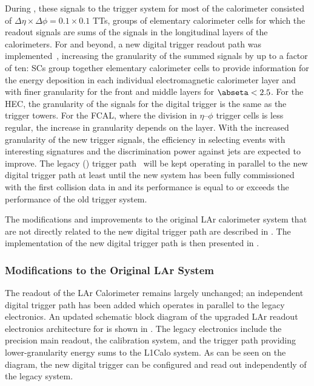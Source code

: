 \documentclass[cernpreprint, atlasdraft=false, UKenglish,british,orcidlogo, texmf, orcidlogo]{atlasdoc}
\begin{document}
During \RunOneTwo, these
signals to the trigger system for most of the calorimeter
consisted of    $\Delta\eta\times\Delta\phi=0.1\times 0.1$  \glspl{TT}, groups of elementary calorimeter cells
for which the readout signals are \analog sums of the signals in the longitudinal layers of the calorimeters.
For \RunThr and beyond, a new digital trigger readout path was implemented~\cite{ATLAS-TDR-22,LArPhaseIPaper}, increasing the granularity
of the summed signals by up to a factor of ten: \glspl{SC} group together elementary calorimeter cells to
provide information for the energy deposition in each individual electromagnetic calorimeter layer
and with finer granularity for the front and middle layers for $\abseta<2.5$.
For the \gls{HEC}, the granularity of the  signals for the digital trigger is the same as the \RunOneTwo trigger towers.
For the \gls{FCAL}, where the division in $\eta$--$\phi$ trigger cells is less regular,
the increase in granularity depends on the layer.
With
the increased granularity of the new trigger signals, the efficiency in selecting
events with interesting signatures and the discrimination power against jets are expected to improve.
The legacy (\RunOneTwo) \analog trigger path~\cite{ATLAS-TDR-22} will be kept operating in parallel to the new digital trigger
path at least until the new system has been fully commissioned with the first collision data in \RunThr
and its performance is equal to or exceeds the performance of the old trigger system.
 
The modifications and improvements
to the original \gls{LAr} calorimeter system that
are not directly related to the new digital trigger path are described in \Sect{\ref{sec:LArMods}}.
The implementation of the new digital
trigger path is then presented in \Sect{\ref{sec:LArDigitalTrigger}}.
 
 
\subsubsection{Modifications to the Original LAr System}
\label{sec:LArMods}

 
The readout of the \gls{LAr} Calorimeter
remains largely unchanged; an independent digital
trigger path has been added which operates in parallel to the legacy electronics.
An updated schematic block diagram of the upgraded \gls{LAr} readout electronics architecture for \RunThr is shown in \Fig{\ref{fig:lar-run3-arch}}. The legacy electronics include the precision main readout, the calibration
system, and the \analog trigger path providing lower-granularity energy sums to the \gls{L1Calo} system. As can be
seen on the diagram, the new digital trigger can be configured and read out independently of the legacy system.
 
\end{document}
